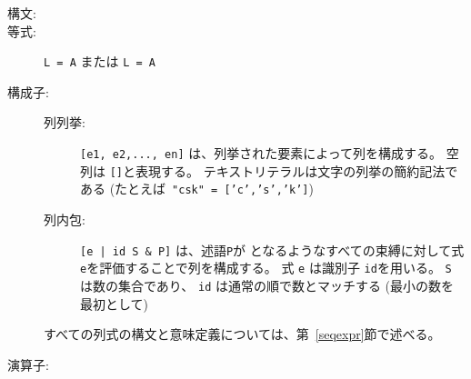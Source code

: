 \documentclass[\pformat,12pt]{jarticle}
\begin{document}
\begin{description}
\item[構文:] 


  
\item[等式:] {\tt L =  A} または {\tt L =  A}%


\item[構成子:] \mbox{}

  \begin{description}
  \item[列列挙:] \verb+[e1, e2,..., en]+ は、列挙された要素によって列を構成する。 
空列は \verb+[]+と表現する。 
テキストリテラルは文字の列挙の簡約記法である (たとえば\ {\tt "csk" = ['c','s','k']})

  \item[列内包:] {\tt [e | id  S \& P]}
    は、述語{\tt P}が  となるようなすべての束縛に対して式 {\tt e}を評価することで列を構成する。
式 {\tt e} は識別子 {\tt id}を用いる。 
{\tt S} は数の集合であり、 {\tt id} は通常の順で数とマッチする (最小の数を最初として)
  \end{description}
  すべての列式の構文と意味定義については、第~\ref{seqexpr}節で述べる。%

      
\item[演算子:] \mbox{}


\end{description}
\end{document}
